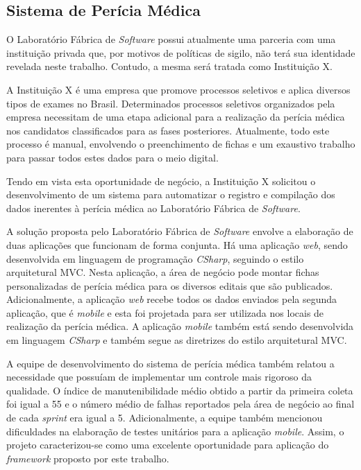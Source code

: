 \subsection{Sistema de Perícia Médica}

O Laboratório Fábrica de \textit{Software} possui atualmente uma parceria com uma instituição privada que, por motivos de políticas de sigilo, não terá sua identidade revelada neste trabalho. Contudo, a mesma será tratada como Instituição X.

A Instituição X é uma empresa que promove processos seletivos e aplica diversos tipos de exames no Brasil. Determinados processos seletivos organizados pela empresa necessitam de uma etapa adicional para a realização da perícia médica nos candidatos classificados para as fases posteriores. Atualmente, todo este processo é manual, envolvendo o preenchimento de fichas e um exaustivo trabalho para passar todos estes dados para o meio digital.

Tendo em vista esta oportunidade de negócio, a Instituição X solicitou o desenvolvimento de um sistema para automatizar o registro e compilação dos dados inerentes à perícia médica ao Laboratório Fábrica de \textit{Software}.

A solução proposta pelo Laboratório Fábrica de \textit{Software} envolve a elaboração de duas aplicações que funcionam de forma conjunta. Há uma aplicação \textit{web}, sendo desenvolvida em linguagem de programação \textit{CSharp}, seguindo o estilo arquitetural MVC. Nesta aplicação, a área de negócio pode montar fichas personalizadas de perícia médica para os diversos editais que são publicados. Adicionalmente, a aplicação \textit{web} recebe todos os dados enviados pela segunda aplicação, que é \textit{mobile} e esta foi projetada para ser utilizada nos locais de realização da perícia médica. A aplicação \textit{mobile} também está sendo desenvolvida em linguagem \textit{CSharp} e também segue as diretrizes do estilo arquitetural MVC.

A equipe de desenvolvimento do sistema de perícia médica também relatou a necessidade que possuíam de implementar um controle mais rigoroso da qualidade. O índice de manutenibilidade médio obtido a partir da primeira coleta foi igual a 55 e o número médio de falhas reportados pela área de negócio ao final de cada \textit{sprint} era igual a 5. Adicionalmente, a equipe também mencionou dificuldades na elaboração de testes unitários para a aplicação \textit{mobile}. Assim, o projeto caracterizou-se como uma excelente oportunidade para aplicação do \textit{framework} proposto por este trabalho.

